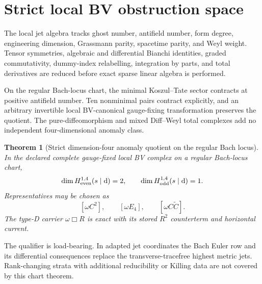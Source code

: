 \documentclass[11pt]{article}
\newtheorem{theorem}{Theorem}[section]
\theoremstyle{definition}
\theoremstyle{remark}
\newcommand{\dd}{\mathrm d}
\begin{document}
\section{Strict local BV obstruction space}

The local jet algebra tracks ghost number, antifield number, form degree,
engineering dimension, Grassmann parity, spacetime parity, and Weyl weight.
Tensor symmetries, algebraic and differential Bianchi identities, graded
commutativity, dummy-index relabelling, integration by parts, and total
derivatives are reduced before exact sparse linear algebra is performed.

On the regular Bach-locus chart, the minimal Koszul--Tate sector contracts at
positive antifield number.  Ten nonminimal pairs contract explicitly, and an
arbitrary invertible local BV-canonical gauge-fixing transformation preserves
the quotient.  The pure-diffeomorphism and mixed Diff--Weyl total complexes
add no independent four-dimensional anomaly class.

\begin{theorem}[Strict dimension-four anomaly quotient on the regular Bach locus]
In the declared complete gauge-fixed local BV complex on a regular
Bach-locus chart,
\[
 \dim H^{1,4}_{\rm even}(s\mid\dd)=2,
 \qquad
 \dim H^{1,4}_{\rm odd}(s\mid\dd)=1.
\]
Representatives may be chosen as
\[
 [\omega C^2],\qquad [\omega E_4],\qquad
 [\omega C\widetilde C].
\]
The type-D carrier $\omega\Box R$ is exact with its stored $R^2$
counterterm and horizontal current.
\end{theorem}

The qualifier is load-bearing.  In adapted jet coordinates the Bach Euler
row and its differential consequences replace the transverse-tracefree
highest metric jets.  Rank-changing strata with additional reducibility or
Killing data are not covered by this chart theorem.
\end{document}
